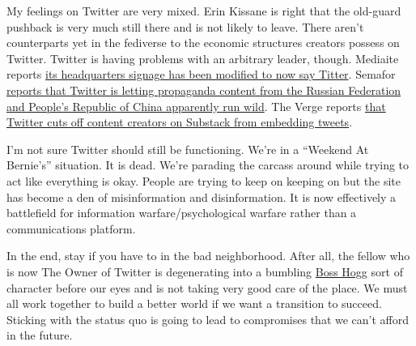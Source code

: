 My feelings on Twitter are very mixed. Erin Kissane is right that the
old-guard pushback is very much still there and is not likely to leave.
There aren't counterparts yet in the fediverse to the economic
structures creators possess on Twitter. Twitter is having problems with
an arbitrary leader, though. Mediaite reports
\href{https://web.archive.org/web/20230406081155/https://www.mediaite.com/news/elon-musk-appears-covered-w-in-twitter-sign-hq-days-after-changing-app-logo-doge-meme/}{its
headquarters signage has been modified to now say Titter}. Semafor
\href{https://web.archive.org/web/20230406183101/https://www.semafor.com/article/04/05/2023/twitter-falls-short-in-policing-russian-and-chinese-state-backed-media}{reports
that Twitter is letting propaganda content from the Russian Federation
and People's Republic of China apparently run wild}. The Verge reports
\href{https://web.archive.org/web/20230407033126/https://www.theverge.com/2023/4/6/23673043/twitter-substack-embeds-bots-tools-api}{that
Twitter cuts off content creators on Substack from embedding tweets}.

I'm not sure Twitter should still be functioning. We're in a ``Weekend
At Bernie's'' situation. It is dead. We're parading the carcass around
while trying to act like everything is okay. People are trying to keep
on keeping on but the site has become a den of misinformation and
disinformation. It is now effectively a battlefield for information
warfare/psychological warfare rather than a communications platform.

In the end, stay if you have to in the bad neighborhood. After all, the
fellow who is now The Owner of Twitter is degenerating into a bumbling
\href{https://en.wikipedia.org/w/index.php?title=Boss_Hogg&oldid=1148453036}{Boss
Hogg} sort of character before our eyes and is not taking very good care
of the place. We must all work together to build a better world if we
want a transition to succeed. Sticking with the status quo is going to
lead to compromises that we can't afford in the future.
